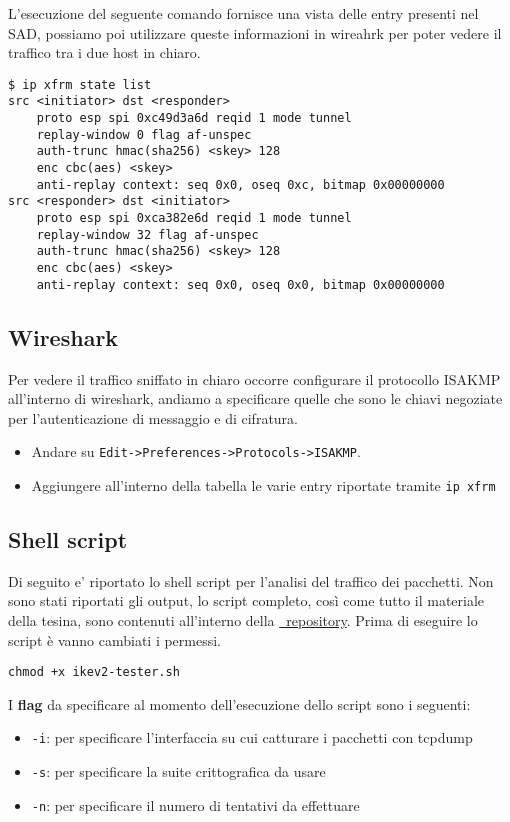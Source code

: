 \documentclass[
10pt, %
a4paper, %
oneside, %
headinclude,footinclude, %
BCOR5mm, %
]{scrartcl}
\begin{document}
\noindent
L'esecuzione del seguente comando fornisce una vista delle entry presenti nel SAD, possiamo poi utilizzare queste informazioni in wireahrk
per poter vedere il traffico tra i due host in chiaro.
\vspace*{0.2cm}
\begin{lstlisting}
$ ip xfrm state list
src <initiator> dst <responder>
    proto esp spi 0xc49d3a6d reqid 1 mode tunnel
    replay-window 0 flag af-unspec
    auth-trunc hmac(sha256) <skey> 128
    enc cbc(aes) <skey>
    anti-replay context: seq 0x0, oseq 0xc, bitmap 0x00000000
src <responder> dst <initiator>
    proto esp spi 0xca382e6d reqid 1 mode tunnel
    replay-window 32 flag af-unspec
    auth-trunc hmac(sha256) <skey> 128
    enc cbc(aes) <skey>
    anti-replay context: seq 0x0, oseq 0x0, bitmap 0x00000000
\end{lstlisting}

\subsection*{Wireshark}
Per vedere il traffico sniffato in chiaro occorre configurare il protocollo ISAKMP all'interno di wireshark, andiamo a specificare quelle che sono
le chiavi negoziate per l'autenticazione di messaggio e di cifratura.

\begin{itemize}
    \item Andare su \lstinline|Edit->Preferences->Protocols->ISAKMP|.
    \item Aggiungere all'interno della tabella le varie entry riportate tramite \lstinline|ip xfrm|
\end{itemize}

\subsection*{Shell script}
\hypertarget{misurazioni}{}
Di seguito e' riportato lo shell script per l'analisi del traffico dei pacchetti.
Non sono stati riportati gli output, lo script completo, così come tutto il materiale della tesina, sono 
contenuti all'interno della \href{https://github.com/DavideDeZuane/IKE}{\faGithub \, repository}.
Prima di eseguire lo script è vanno cambiati i permessi.

\vspace*{0.2cm}
\begin{lstlisting}
chmod +x ikev2-tester.sh
\end{lstlisting}
\noindent
I \textbf{flag} da specificare al momento dell'esecuzione dello script sono i seguenti:
\begin{itemize}
    \item \lstinline|-i|: per specificare l'interfaccia su cui catturare i pacchetti con tcpdump
    \item \lstinline|-s|: per specificare la suite crittografica da usare
    \item \lstinline|-n|: per specificare il numero di tentativi da effettuare
\end{itemize}
\end{document}

